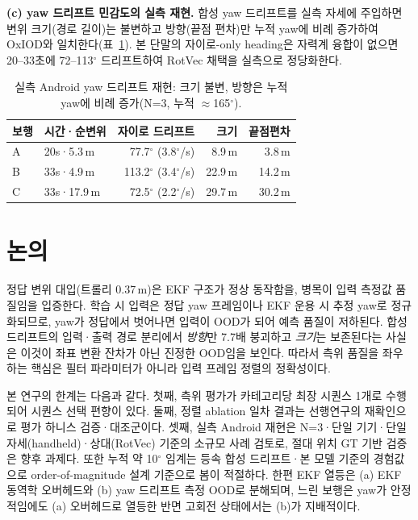 \documentclass[10pt,twocolumn,a4paper]{article}
\begin{document}
\noindent\textbf{(c) yaw 드리프트 민감도의 실측 재현.} 합성 yaw 드리프트를 실측 자세에 주입하면 변위 크기(경로 길이)는 불변하고 방향(끝점 편차)만 누적 yaw에 비례 증가하여 OxIOD와 일치한다(표~\ref{tab:android-yaw}). 본 단말의 자이로-only heading은 자력계 융합이 없으면 20--33초에 72--113$^\circ$ 드리프트하여 RotVec 채택을 실측으로 정당화한다.

\begin{table}[t]
\caption{실측 Android yaw 드리프트 재현: 크기 불변, 방향은 누적 yaw에 비례 증가(N=3, 누적 $\approx$165$^\circ$).}
\label{tab:android-yaw}
\centering\footnotesize
\begin{tabular}{@{}llrrr@{}}
\toprule
보행 & 시간·순변위 & 자이로 드리프트 & 크기 & 끝점편차 \\ \midrule
A & 20s·5.3\,m & 77.7$^\circ$ (3.8$^\circ$/s) & 8.9\,m & 3.8\,m \\
B & 33s·4.9\,m & 113.2$^\circ$ (3.4$^\circ$/s) & 22.9\,m & 14.2\,m \\
C & 33s·17.9\,m & 72.5$^\circ$ (2.2$^\circ$/s) & 29.7\,m & 30.2\,m \\ \bottomrule
\end{tabular}
\end{table}

\section{논의}
정답 변위 대입(트롤리 0.37\,m)은 EKF 구조가 정상 동작함을, 병목이 입력 측정값 품질임을 입증한다. 학습 시 입력은 정답 yaw 프레임이나 EKF 운용 시 추정 yaw로 정규화되므로, yaw가 정답에서 벗어나면 입력이 OOD가 되어 예측 품질이 저하된다. 합성 드리프트의 입력·출력 경로 분리에서 \emph{방향}만 7.7배 붕괴하고 \emph{크기}는 보존된다는 사실은 이것이 좌표 변환 잔차가 아닌 진정한 OOD임을 보인다. 따라서 측위 품질을 좌우하는 핵심은 필터 파라미터가 아니라 입력 프레임 정렬의 정확성이다.

본 연구의 한계는 다음과 같다. 첫째, 측위 평가가 카테고리당 최장 시퀀스 1개로 수행되어 시퀀스 선택 편향이 있다. 둘째, 정렬 ablation 일차 결과는 선행연구의 재확인으로 평가 하니스 검증·대조군이다. 셋째, 실측 Android 재현은 N=3·단일 기기·단일 자세(handheld)·상대(RotVec) 기준의 소규모 사례 검토로, 절대 위치 GT 기반 검증은 향후 과제다. 또한 누적 약 10$^\circ$ 임계는 등속 합성 드리프트·본 모델 기준의 경험값으로 order-of-magnitude 설계 기준으로 봄이 적절하다. 한편 EKF 열등은 (a) EKF 동역학 오버헤드와 (b) yaw 드리프트 측정 OOD로 분해되며, 느린 보행은 yaw가 안정적임에도 (a) 오버헤드로 열등한 반면 고회전 상태에서는 (b)가 지배적이다.
\end{document}
